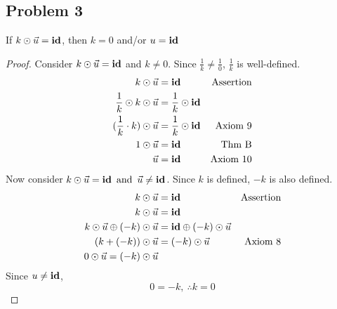 \subsection*{Problem 3}
 If $k \odot \vec{u} = \textbf{id}$, then $k=0$ and/or $u = \textbf{id}$
\begin{proof}
  Consider $k \odot \vec{u} = \textbf{id}$ and $k \neq 0 $. Since $\frac{1}{k} \neq \frac{1}{0}$, $\frac{1}{k}$ is well-defined.
  \begin{align*}
    k \odot \vec{u}                     & = \textbf{id}                   & \text{Assertion} \\
    \frac{1}{k} \odot k \odot \vec{u}   & = \frac{1}{k} \odot \textbf{id}                    \\
    (\frac{1}{k} \cdot k) \odot \vec{u} & = \frac{1}{k} \odot \textbf{id} & \text{Axiom 9}   \\
    1 \odot \vec{u}                     & = \textbf{id}                   & \text{Thm B}     \\
    \vec{u}                             & = \textbf{id}                   & \text{Axiom 10}
  \end{align*}
  Now consider $k \odot \vec{u} = \textbf{id} \operatorname{~\text{and}~} \vec{u} \neq \textbf{id}$. Since $k$ is defined, $-k$ is also defined.
  \begin{align*}
    k \odot \vec{u}                           & = \textbf{id}                           & \text{Assertion} \\
    k \odot \vec{u}                           & = \textbf{id}                                              \\
    k \odot \vec{u} \oplus (-k) \odot \vec{u} & = \textbf{id} \oplus (-k) \odot \vec{u}                    \\
    (k+ (-k)) \odot \vec{u}                   & = (-k) \odot \vec{u}                 & \text{Axiom 8}   \\
    0 \odot \vec{u} = (-k) \odot \vec{u}
  \end{align*}
  Since $u \neq \textbf{id}$,
  \[
    0 = -k,~\therefore k = 0
  \]
\end{proof}

